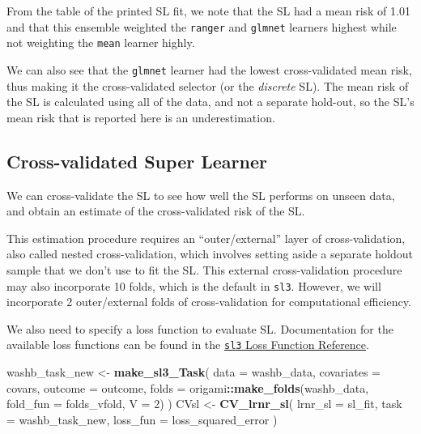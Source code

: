 \documentclass[12pt, krantz2,]{krantz}
\newenvironment{Shaded}{\begin{snugshade}}{\end{snugshade}}
\newcommand{\DataTypeTok}[1]{\textcolor[rgb]{0.27,0.27,0.27}{#1}}
\newcommand{\DecValTok}[1]{\textcolor[rgb]{0.06,0.06,0.06}{#1}}
\newcommand{\KeywordTok}[1]{\textcolor[rgb]{0.27,0.27,0.27}{\textbf{#1}}}
\newcommand{\NormalTok}[1]{#1}
\newcommand{\OperatorTok}[1]{\textcolor[rgb]{0.43,0.43,0.43}{\textbf{#1}}}
\newcommand{\StringTok}[1]{\textcolor[rgb]{0.5,0.5,0.5}{#1}}
\theoremstyle{definition}
\theoremstyle{definition}
\theoremstyle{definition}
\newcommand{\1}{\mathbbm{1}}
\begin{document}
From the table of the printed SL fit, we note that the SL had a mean risk of
1.01 and that
this ensemble weighted the \texttt{ranger} and \texttt{glmnet} learners highest while not
weighting the \texttt{mean} learner highly.

We can also see that the \texttt{glmnet} learner had the lowest cross-validated mean
risk, thus making it the cross-validated selector (or the \emph{discrete} SL). The
mean risk of the SL is calculated using all of the data, and not a separate
hold-out, so the SL's mean risk that is reported here is an underestimation.

\hypertarget{cross-validated-super-learner}{%
\subsection*{Cross-validated Super Learner}\label{cross-validated-super-learner}}


We can cross-validate the SL to see how well the SL performs on unseen data,
and obtain an estimate of the cross-validated risk of the SL.

This estimation procedure requires an ``outer/external'' layer of
cross-validation, also called nested cross-validation, which involves setting
aside a separate holdout sample that we don't use to fit the SL. This external
cross-validation procedure may also incorporate 10 folds, which is the default
in \texttt{sl3}. However, we will incorporate 2 outer/external folds of
cross-validation for computational efficiency.

We also need to specify a loss function to evaluate SL. Documentation for the
available loss functions can be found in the \href{https://tlverse.org/sl3/reference/loss_functions.html}{\texttt{sl3} Loss
Function Reference}.

\begin{Shaded}
\begin{Highlighting}[]
\NormalTok{washb_task_new <-}\StringTok{ }\KeywordTok{make_sl3_Task}\NormalTok{(}
  \DataTypeTok{data =}\NormalTok{ washb_data,}
  \DataTypeTok{covariates =}\NormalTok{ covars,}
  \DataTypeTok{outcome =}\NormalTok{ outcome,}
  \DataTypeTok{folds =}\NormalTok{ origami}\OperatorTok{::}\KeywordTok{make_folds}\NormalTok{(washb_data, }\DataTypeTok{fold_fun =}\NormalTok{ folds_vfold, }\DataTypeTok{V =} \DecValTok{2}\NormalTok{)}
\NormalTok{)}
\NormalTok{CVsl <-}\StringTok{ }\KeywordTok{CV_lrnr_sl}\NormalTok{(}
  \DataTypeTok{lrnr_sl =}\NormalTok{ sl_fit, }\DataTypeTok{task =}\NormalTok{ washb_task_new, }\DataTypeTok{loss_fun =}\NormalTok{ loss_squared_error}
\NormalTok{)}
\end{Highlighting}
\end{Shaded}
\end{document}
